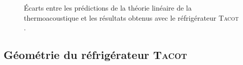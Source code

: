 \begin{figure}[!ht]
    \centering
	\begin{subfigure}{.47\textwidth}
		\centering
		\caption{}
		\label{fig:ATE_ProfilsAX_5mm}
	\end{subfigure}		
	\begin{subfigure}{.47\textwidth}
		\centering
		\caption{}
		\label{fig:ATE_ProfilsCHX_5mm}
	\end{subfigure}	    
    \caption{\'Ecarts entre les prédictions de la théorie linéaire de la thermoacoustique et les résultats obtenus avec le réfrigérateur \textsc{Tacot} \cite{ramadan_design_2021}.}
    \label{fig:ATE_Profils_5mm}
\end{figure}

\subsection{Géométrie du réfrigérateur \textsc{Tacot}}
